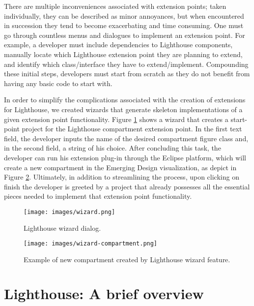 \documentclass[10pt, conference, compsocconf]{IEEEtran}
\begin{document}
There are multiple inconveniences associated with extension points; taken individually, they can be described as minor annoyances, but when encountered in succession they tend to become exacerbating and time consuming.  One must go through countless menus and dialogues to implement an extension point. For example, a developer must include dependencies to Lighthouse components, manually locate which Lighthouse extension point they are planning to extend, and identify which class/interface they have to extend/implement.  Compounding these initial steps, developers must start from scratch as they do not benefit from having any basic code to start with. 

In order to simplify the complications associated with the creation of extensions for Lighthouse, we created wizards that generate skeleton implementations of a given extension point functionality. Figure \ref{fig:wizard} shows a wizard that creates a start-point project for the Lighthouse compartment extension point. In the first text field, the developer inputs the name of the desired compartment figure class and, in the second field, a string of his choice. After concluding this task, the developer can run his extension plug-in through the Eclipse platform, which will create a new compartment in the Emerging Design visualization, as depict in Figure \ref{fig:wizard-compartment}.  Ultimately, in addition to streamlining the process, upon clicking on finish the developer is greeted by a project that already possesses all the essential pieces needed to implement that extension point functionality.

\begin{figure}[!t]
	\centering
		\texttt{[image: images/wizard.png]}
	\caption{Lighthouse wizard dialog.}
	\label{fig:wizard}
\end{figure}

\begin{figure}[!t]
	\centering
		\texttt{[image: images/wizard-compartment.png]}
	\caption{Example of new compartment created by Lighthouse wizard feature.}
	\label{fig:wizard-compartment}
\end{figure}

\section{Lighthouse: A brief overview}
\end{document}
